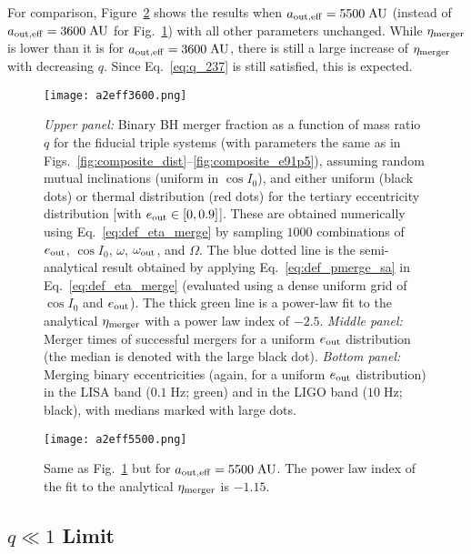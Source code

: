 \documentclass[
        fleqn,
        usenatbib,
    ]{mnras}
\begin{document}
For comparison, Figure~\ref{fig:popsynth5500} shows the results when
$a_{\rm out, eff} = 5500\;\mathrm{AU}$ (instead of $a_{\rm out, eff} =
3600\;\mathrm{AU}$ for Fig.~\ref{fig:popsynth}) with all other parameters
unchanged. While $\eta_{\rm merger}$ is lower than it is for $a_{\rm out, eff} =
3600\;\mathrm{AU}$, there is still a large increase of $\eta_{\rm merger}$ with
decreasing $q$. Since Eq.~\eqref{eq:q_237} is still satisfied, this is expected.
\begin{figure}
    \centering
    \texttt{[image: a2eff3600.png]}
    \caption{\emph{Upper panel:} Binary BH merger fraction as a function of mass
    ratio $q$ for the fiducial triple systems (with parameters the same as in
    Figs.~\ref{fig:composite_dist}--\ref{fig:composite_e91p5}), assuming random
    mutual inclinations (uniform in $\cos I_0$), and either uniform (black dots)
    or thermal distribution (red dots) for the tertiary eccentricity
    distribution [with $e_{\rm out} \in [0,0.9]$]. These are obtained
    numerically using Eq.~\eqref{eq:def_eta_merge} by sampling $1000$
    combinations of $e_{\rm out}$, $\cos I_0$, $\omega$, $\omega_{\rm out}$, and
    $\Omega$. The blue dotted line is the semi-analytical
    result obtained by applying Eq.~\eqref{eq:def_pmerge_sa} in
    Eq.~\eqref{eq:def_eta_merge} (evaluated using a dense uniform grid of $\cos
    I_0$ and $e_{\rm out}$). The thick green line is a power-law fit to the
    analytical $\eta_{\rm merger}$ with a power law index of $-2.5$.
    \emph{Middle panel:} Merger times of successful mergers for a uniform
    $e_{\rm out}$ distribution (the median is denoted with the large black dot).
    \emph{Bottom panel:} Merging binary eccentricities (again, for a uniform
    $e_{\rm out}$ distribution) in the LISA band ($0.1\;\mathrm{Hz}$; green) and
    in the LIGO band ($10 \;\mathrm{Hz}$; black), with medians marked with large
    dots. }\label{fig:popsynth}
\end{figure}
\begin{figure}
    \centering
    \texttt{[image: a2eff5500.png]}
    \caption{Same as Fig.~\ref{fig:popsynth} but for $a_{\rm out, eff} =
    5500\;\mathrm{AU}$. The power law index of the fit to the
    analytical $\eta_{\rm merger}$ is $-1.15$. }\label{fig:popsynth5500}
\end{figure}

\subsection{$q \ll 1$ Limit}
\end{document}
